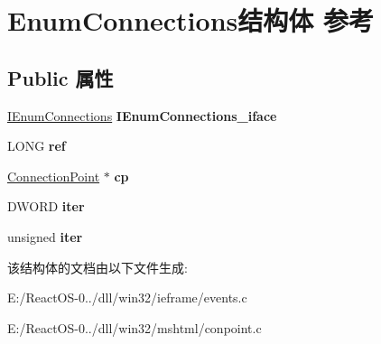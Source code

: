 \hypertarget{struct_enum_connections}{}\section{Enum\+Connections结构体 参考}
\label{struct_enum_connections}
\subsection*{Public 属性}
\begin{DoxyCompactItemize}
\item 
\mbox{\label{struct_enum_connections_a610aabdd6cd7fc398471c2dea8ac868d}} 
\hyperlink{interface_i_enum_connections}{I\+Enum\+Connections} {\bfseries I\+Enum\+Connections\+\_\+iface}
\item 
\mbox{\label{struct_enum_connections_abcd6f2a536626a9bbfdbb3cf4d9ed87d}} 
L\+O\+NG {\bfseries ref}
\item 
\mbox{\label{struct_enum_connections_a0ca6a9f2e20536b2d2e144d0c2ecbc16}} 
\hyperlink{struct_connection_point}{Connection\+Point} $\ast$ {\bfseries cp}
\item 
\mbox{\label{struct_enum_connections_a327feee378e37975e3237621d02af4f1}} 
D\+W\+O\+RD {\bfseries iter}
\item 
\mbox{\label{struct_enum_connections_a87551b6cf871935d0c501aee6e901f75}} 
unsigned {\bfseries iter}
\end{DoxyCompactItemize}


该结构体的文档由以下文件生成\+:\begin{DoxyCompactItemize}
\item 
E\+:/\+React\+O\+S-\/0../dll/win32/ieframe/events.\+c\item 
E\+:/\+React\+O\+S-\/0../dll/win32/mshtml/conpoint.\+c\end{DoxyCompactItemize}
